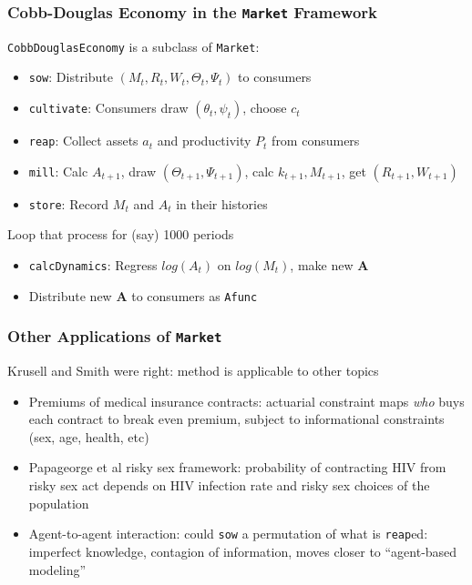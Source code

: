 \documentclass[11ptt]{beamer}
\newcommand{\bi}{\begin{itemize}}
\newcommand{\ei}{\end{itemize}}
\begin{document}
\begin{frame}
\frametitle{Cobb-Douglas Economy in the \texttt{Market} Framework}

\texttt{CobbDouglasEconomy} is a subclass of \texttt{Market}:

\bi
\item \texttt{sow}: Distribute $(M_t,R_t,W_t,\Theta_t,\Psi_t)$ to consumers

\item \texttt{cultivate}: Consumers draw $(\theta_t,\psi_t)$, choose $c_t$

\item \texttt{reap}: Collect assets $a_t$ and productivity $P_t$ from consumers

\item \texttt{mill}: Calc $A_{t+1}$, draw $(\Theta_{t+1},\Psi_{t+1})$, calc $k_{t+1}, M_{t+1}$, get $(R_{t+1},W_{t+1})$

\item \texttt{store}: Record $M_t$ and $A_t$ in their histories
\ei

Loop that process for (say) 1000 periods
\begin{itemize}
\item \texttt{calcDynamics}: Regress $log(A_t)$ on $log(M_t)$, make new \textbf{A}

\item Distribute new \textbf{A} to consumers as \texttt{Afunc}
\end{itemize}
\end{frame}



\begin{frame}
\frametitle{Other Applications of \texttt{Market}}
Krusell and Smith were right: method is applicable to other topics

\bi
\item <1->Premiums of medical insurance contracts: actuarial constraint maps \textit{who} buys each contract to break even premium, subject to informational constraints (sex, age, health, etc)

\item <2->Papageorge et al risky sex framework: probability of contracting HIV from risky sex act depends on HIV infection rate and risky sex choices of the population

\item <3->Agent-to-agent interaction: could \texttt{sow} a permutation of what is \texttt{reap}ed: imperfect knowledge, contagion of information, moves closer to ``agent-based modeling''
\ei

\hyperlink{DiscussionTopics}{}

\end{frame}
\end{document}

